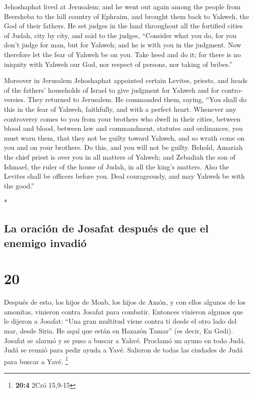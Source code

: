 \begin{paracol}{2}
\begin{otherlanguage}{english}
 Jehoshaphat lived at Jerusalem; and he went out again
among the people from Beersheba to the hill country of Ephraim, and
brought them back to Yahweh, the God of their fathers.  He
set judges in the land throughout all the fortified cities of Judah,
city by city,  and said to the judges, ``Consider what you
do, for you don't judge for man, but for Yahweh; and he is with you in
the judgment.  Now therefore let the fear of Yahweh be on
you. Take heed and do it; for there is no iniquity with Yahweh our God,
nor respect of persons, nor taking of bribes.''

 Moreover in Jerusalem Jehoshaphat appointed certain
Levites, priests, and heads of the fathers' households of Israel to give
judgment for Yahweh and for controversies. They returned to Jerusalem.
 He commanded them, saying, ``You shall do this in the
fear of Yahweh, faithfully, and with a perfect heart. 
Whenever any controversy comes to you from your brothers who dwell in
their cities, between blood and blood, between law and commandment,
statutes and ordinances, you must warn them, that they not be guilty
toward Yahweh, and so wrath come on you and on your brothers. Do this,
and you will not be guilty.  Behold, Amariah the chief
priest is over you in all matters of Yahweh; and Zebadiah the son of
Ishmael, the ruler of the house of Judah, in all the king's matters.
Also the Levites shall be officers before you. Deal courageously, and
may Yahweh be with the good.''

\end{otherlanguage}

\switchcolumn[0]*

\hypertarget{la-oraciuxf3n-de-josafat-despuuxe9s-de-que-el-enemigo-invadiuxf3}{%
\subsection{La oración de Josafat después de que el enemigo
invadió}\label{la-oraciuxf3n-de-josafat-despuuxe9s-de-que-el-enemigo-invadiuxf3}}

\hypertarget{section-38}{%
\section{20}\label{section-38}}

 Después de esto, los hijos de Moab, los hijos de Amón, y
con ellos algunos de los amonitas, vinieron contra Josafat para
combatir.  Entonces vinieron algunos que le dijeron a
Josafat: ``Una gran multitud viene contra ti desde el otro lado del mar,
desde Siria. He aquí que están en Hazazón Tamar'' (es decir, En Gedi).
 Josafat se alarmó y se puso a buscar a Yahvé. Proclamó un
ayuno en todo Judá.  Judá se reunió para pedir ayuda a
Yavé. Salieron de todas las ciudades de Judá para buscar a Yavé.
\footnote{\textbf{20:4} 2Cró 15,9-15}


\end{paracol}
